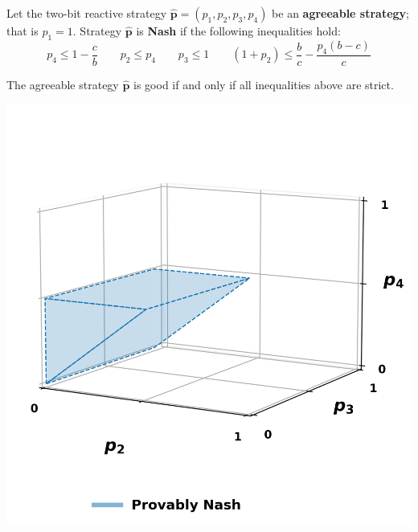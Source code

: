 \documentclass{beamer}
\begin{document}
\begin{frame}
    \footnotesize{
    \begin{theorem}
        Let the two-bit reactive strategy \(\mathbf{\hat{p}} = (p_{1}, p_{2}, p_{3}, p_{4})\) be an \textbf{agreeable
        strategy}; that is \(p_1 = 1\). Strategy \(\mathbf{\hat{p}}\) is \textbf{Nash} if the
        following inequalities hold:
        \begin{equation*}
            p_4 \leq 1 - \frac{c}{b} \qquad  p_2  \leq p_4 \qquad p_3 \leq 1 \qquad (1 + p_2) \leq \frac{b}{c} - \frac{p_4 (b - c)}{c}
        \end{equation*}
        
        The agreeable strategy \(\mathbf{\hat{p}}\) is good if and only if all inequalities above are strict.
    \end{theorem}}
\end{frame}

\begin{frame}
    \begin{center}
        \includegraphics[width=.65\textwidth]{static/one}
    \end{center}
\end{frame}
\end{document}
